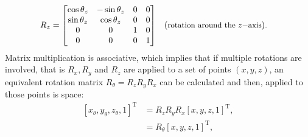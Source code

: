 \begin{refsection}
\begin{subequations}
\begin{align}
            R_z &= \begin{bmatrix}
                            \cos\theta_z & -\sin\theta_z & 0 &0\\
                            \sin\theta_z & \cos\theta_z & 0 &0\\
                            0 & 0 & 1 &0\\
                            0 & 0 & 0 &1
            \end{bmatrix}  &&(\small{\text{rotation around the $z-$axis}}).
    \end{align}
\end{subequations}{}
Matrix multiplication is associative, which implies that if multiple rotations are involved, that is $R_x, R_y$ and $R_z$ are applied to a set of points $(x,y,z)$, an equivalent rotation matrix $R_{\theta}=R_zR_yR_x$ can be calculated and then, applied to those points is space: 
\begin{align}\label{eq:affine2}
    [x_\theta,y_\theta,z_\theta,1]^\text{T} & = R_zR_yR_x[x,y,z,1]^\text{T},\nonumber \\
     & = R_\theta[x,y,z,1]^\text{T},
\end{align}{}

\end{refsection}

